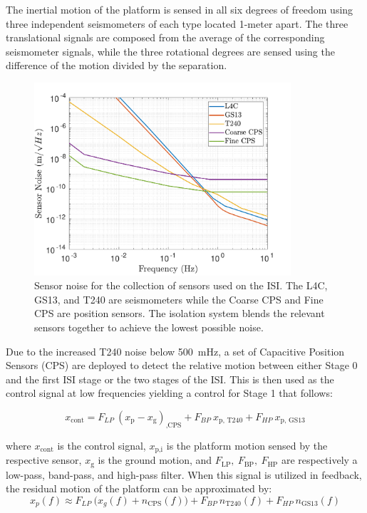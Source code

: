\documentclass [12pt, proquest]{uwthesis}[2019]
\begin{document}
The inertial motion of the platform is sensed in all six degrees of freedom using three independent seismometers of each type located 1-meter apart. The three translational signals are composed from the average of the corresponding seismometer signals, while the three rotational degrees are sensed using the difference of the motion divided by the separation.

\begin{figure}[!h]
\begin{center}
\includegraphics[width=0.85\textwidth]{seismicSensNoise.pdf}
\caption[Sensor noise for the seismic isolation system]{Sensor noise for the collection of sensors used on the ISI. The L4C, GS13, and T240 are seismometers while the Coarse CPS and Fine CPS are position sensors. The isolation system blends the relevant sensors together to achieve the lowest possible noise.}
\label{seisNoise}
\end{center}
\end{figure}

Due to the increased T240 noise below 500~mHz, a set of Capacitive Position Sensors (CPS) are deployed to detect the relative motion between either Stage 0 and the first ISI stage or the two stages of the ISI. This is then used as the control signal at low frequencies yielding a control for Stage 1 that follows:

\begin{equation}
x_\text{cont}=F_{LP}\ (x_\text{p}-x_\text{g})_\text{,CPS}+F_{BP}\ x_\text{p, T240}+F_{HP}\ x_\text{p, GS13}
\end{equation}

where $x_\text{cont}$ is the control signal, $x_\text{p,i}$ is the platform motion sensed by the respective sensor, $x_\text{g}$ is the ground motion, and $F_\text{LP},\  F_\text{BP},\ F_\text{HP}$ are respectively a low-pass, band-pass, and high-pass filter. When this signal is utilized in feedback, the residual motion of the platform can be approximated by:
\begin{equation}
x_p(f)\approx F_{LP}\ \big(x_g(f)+n_\text{CPS}(f)\big)+F_{BP}\ n_\text{T240}(f)+F_{HP}\ n_\text{GS13}(f)
\end{equation}
\end{document}
